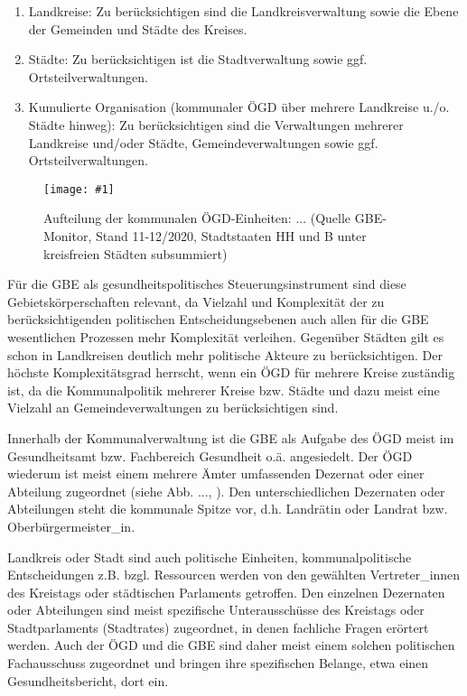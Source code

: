 \documentclass{article}
\newlength{\imgwidth}
\newcommand\scaledgraphics[2]{%
                
\settowidth{\imgwidth}{\texttt{[image: \#1]}}%
                
\setlength{\imgwidth}{\minof{\imgwidth}{#2\textwidth}}%
                
\texttt{[image: \#1]}%
                
}
\begin{document}
\begin{enumerate}
\item Landkreise: Zu berücksichtigen sind die Landkreisverwaltung sowie die Ebene der Gemeinden und Städte des Kreises.


\item Städte: Zu berücksichtigen ist die Stadtverwaltung sowie ggf. Ortsteilverwaltungen.


\item Kumulierte Organisation (kommunaler ÖGD über mehrere Landkreise u./o. Städte hinweg): Zu berücksichtigen sind die Verwaltungen mehrerer Landkreise und/oder Städte, Gemeindeverwaltungen sowie ggf. Ortsteilverwaltungen.


\end{enumerate}

\begin{center}
\begin{figure}
\scaledgraphics{d6f2d7f1-3336-438f-9216-768a1f38c17e.png}{0.5}
\caption*{Aufteilung der kommunalen ÖGD-Einheiten: ... (Quelle GBE-Monitor, Stand 11-12/2020, Stadtstaaten HH und B unter kreisfreien Städten subsummiert)}\label{F10503981}
\end{figure}


\end{center}


Für die GBE als gesundheitspolitisches Steuerungsinstrument sind diese Gebietskörperschaften relevant, da Vielzahl und Komplexität der zu berücksichtigenden politischen Entscheidungsebenen auch allen für die GBE wesentlichen Prozessen mehr Komplexität verleihen. Gegenüber Städten gilt es schon in Landkreisen deutlich mehr politische Akteure zu berücksichtigen. Der höchste Komplexitätsgrad herrscht, wenn ein ÖGD für mehrere Kreise zuständig ist, da die Kommunalpolitik mehrerer Kreise bzw. Städte und dazu meist eine Vielzahl an Gemeindeverwaltungen zu berücksichtigen sind.  


Innerhalb der Kommunalverwaltung ist die GBE als Aufgabe des ÖGD meist im Gesundheitsamt bzw. Fachbereich Gesundheit o.ä. angesiedelt. Der ÖGD wiederum ist meist einem mehrere Ämter umfassenden Dezernat oder einer Abteilung zugeordnet (siehe Abb. ..., \autocite{SzagunBundweitere2016}). Den unterschiedlichen Dezernaten oder Abteilungen steht die kommunale Spitze vor, d.h. Landrätin oder Landrat bzw. Oberbürgermeister\_in. 


Landkreis oder Stadt sind auch politische Einheiten, kommunalpolitische Entscheidungen z.B. bzgl. Ressourcen werden von den gewählten Vertreter\_innen des Kreistags oder städtischen Parlaments getroffen. Den einzelnen Dezernaten oder Abteilungen sind meist spezifische Unterausschüsse des Kreistags oder Stadtparlaments (Stadtrates) zugeordnet, in denen fachliche Fragen erörtert werden. Auch der ÖGD und die GBE sind daher meist einem solchen politischen Fachausschuss zugeordnet und bringen ihre spezifischen Belange, etwa einen Gesundheitsbericht, dort ein. 
\end{document}
